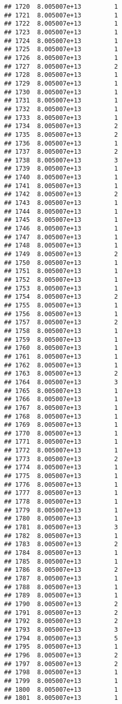 \documentclass[
]{article}
\begin{document}
\begin{verbatim}
## 1720  8.005007e+13         1
## 1721  8.005007e+13         1
## 1722  8.005007e+13         1
## 1723  8.005007e+13         1
## 1724  8.005007e+13         1
## 1725  8.005007e+13         1
## 1726  8.005007e+13         1
## 1727  8.005007e+13         2
## 1728  8.005007e+13         1
## 1729  8.005007e+13         1
## 1730  8.005007e+13         1
## 1731  8.005007e+13         1
## 1732  8.005007e+13         1
## 1733  8.005007e+13         1
## 1734  8.005007e+13         2
## 1735  8.005007e+13         2
## 1736  8.005007e+13         1
## 1737  8.005007e+13         2
## 1738  8.005007e+13         3
## 1739  8.005007e+13         1
## 1740  8.005007e+13         1
## 1741  8.005007e+13         1
## 1742  8.005007e+13         2
## 1743  8.005007e+13         1
## 1744  8.005007e+13         1
## 1745  8.005007e+13         1
## 1746  8.005007e+13         1
## 1747  8.005007e+13         1
## 1748  8.005007e+13         1
## 1749  8.005007e+13         2
## 1750  8.005007e+13         1
## 1751  8.005007e+13         1
## 1752  8.005007e+13         1
## 1753  8.005007e+13         1
## 1754  8.005007e+13         2
## 1755  8.005007e+13         1
## 1756  8.005007e+13         1
## 1757  8.005007e+13         2
## 1758  8.005007e+13         1
## 1759  8.005007e+13         1
## 1760  8.005007e+13         1
## 1761  8.005007e+13         1
## 1762  8.005007e+13         1
## 1763  8.005007e+13         2
## 1764  8.005007e+13         3
## 1765  8.005007e+13         1
## 1766  8.005007e+13         1
## 1767  8.005007e+13         1
## 1768  8.005007e+13         1
## 1769  8.005007e+13         1
## 1770  8.005007e+13         1
## 1771  8.005007e+13         1
## 1772  8.005007e+13         1
## 1773  8.005007e+13         2
## 1774  8.005007e+13         1
## 1775  8.005007e+13         1
## 1776  8.005007e+13         1
## 1777  8.005007e+13         1
## 1778  8.005007e+13         1
## 1779  8.005007e+13         1
## 1780  8.005007e+13         1
## 1781  8.005007e+13         3
## 1782  8.005007e+13         1
## 1783  8.005007e+13         2
## 1784  8.005007e+13         1
## 1785  8.005007e+13         1
## 1786  8.005007e+13         2
## 1787  8.005007e+13         1
## 1788  8.005007e+13         1
## 1789  8.005007e+13         1
## 1790  8.005007e+13         2
## 1791  8.005007e+13         2
## 1792  8.005007e+13         2
## 1793  8.005007e+13         3
## 1794  8.005007e+13         5
## 1795  8.005007e+13         1
## 1796  8.005007e+13         2
## 1797  8.005007e+13         2
## 1798  8.005007e+13         1
## 1799  8.005007e+13         1
## 1800  8.005007e+13         1
## 1801  8.005007e+13         1

\end{verbatim}
\end{document}
